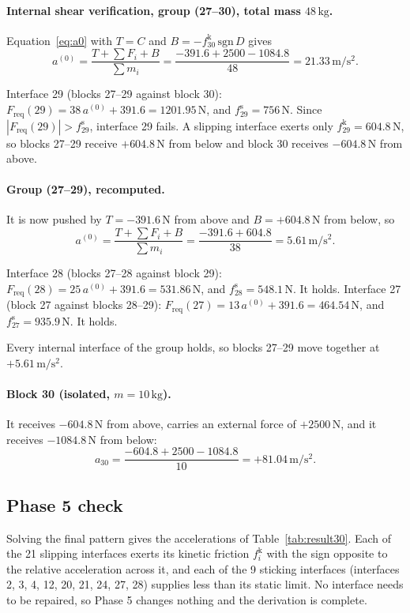 \documentclass[11pt,a4paper]{article}
\begin{document}
\paragraph{Internal shear verification, group (27--30), total mass $48\,\mathrm{kg}$.} Equation~\eqref{eq:a0} with $T=C$ and $B=-f^{\mathrm k}_{30}\,\mathrm{sgn}\,D$ gives\[a^{(0)}=\dfrac{T+\sum F_i+B}{\sum m_i}=\dfrac{-391.6 + 2500 - 1084.8}{48}=21.33\,\mathrm{m/s^2}.\]

Interface 29 (blocks 27--29 against block 30): $F_{\mathrm{req}}(29)=38\,a^{(0)} + 391.6=1201.95\,\mathrm{N}$, and $f^{\mathrm s}_{29}=756\,\mathrm{N}$. Since $|F_{\mathrm{req}}(29)|>f^{\mathrm s}_{29}$, interface 29 fails. A slipping interface exerts only $f^{\mathrm k}_{29}=604.8\,\mathrm{N}$, so blocks 27--29 receive $+604.8\,\mathrm{N}$ from below and block 30 receives $-604.8\,\mathrm{N}$ from above.

\paragraph{Group (27--29), recomputed.} It is now pushed by $T=-391.6\,\mathrm{N}$ from above and $B=+604.8\,\mathrm{N}$ from below, so\[a^{(0)}=\dfrac{T+\sum F_i+B}{\sum m_i}=\dfrac{-391.6 + 604.8}{38}=5.61\,\mathrm{m/s^2}.\]

Interface 28 (blocks 27--28 against block 29): $F_{\mathrm{req}}(28)=25\,a^{(0)} + 391.6=531.86\,\mathrm{N}$, and $f^{\mathrm s}_{28}=548.1\,\mathrm{N}$. It holds. Interface 27 (block 27 against blocks 28--29): $F_{\mathrm{req}}(27)=13\,a^{(0)} + 391.6=464.54\,\mathrm{N}$, and $f^{\mathrm s}_{27}=935.9\,\mathrm{N}$. It holds.

Every internal interface of the group holds, so blocks 27--29 move together at $+5.61\,\mathrm{m/s^2}$.

\paragraph{Block 30 (isolated, $m=10\,\mathrm{kg}$).} It receives $-604.8\,\mathrm{N}$ from above, carries an external force of $+2500\,\mathrm{N}$, and it receives $-1084.8\,\mathrm{N}$ from below:\[a_{30}=\dfrac{-604.8 + 2500 - 1084.8}{10}=+81.04\,\mathrm{m/s^2}.\]

\subsection{Phase 5 check}
Solving the final pattern gives the accelerations of Table~\ref{tab:result30}. Each of the 21 slipping interfaces exerts its kinetic friction $f^{\mathrm k}_i$ with the sign opposite to the relative acceleration across it, and each of the 9 sticking interfaces (interfaces 2, 3, 4, 12, 20, 21, 24, 27, 28) supplies less than its static limit. No interface needs to be repaired, so Phase 5 changes nothing and the derivation is complete.
\end{document}

